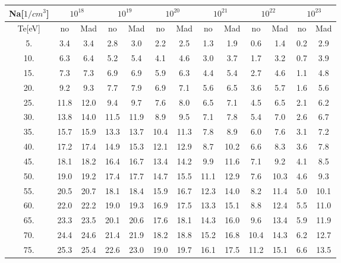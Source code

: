 \begin{tabular}{|c||c|c|c|c|c|c|c|c|c|c|c|c|}
\hline
Na[$1/cm^3$] & \multicolumn{2}{|c|}{$10^{18}$} & \multicolumn{2}{|c|}{$10^{19}$} & \multicolumn{2}{|c|}{$10^{20}$} & \multicolumn{2}{|c|}{$10^{21}$} & \multicolumn{2}{|c|}{$10^{22}$} & \multicolumn{2}{|c|}{$10^{23}$}\tabularnewline
\hline
Te[eV] & no & Mad & no & Mad & no & Mad & no & Mad & no & Mad & no & Mad\tabularnewline
\hline
\hline
   5. &     3.4 &     3.4 &     2.8 &     3.0 &     2.2 &     2.5 &     1.3 &     1.9 &     0.6 &     1.4 &     0.2 &     2.9\tabularnewline
\hline
  10. &     6.3 &     6.4 &     5.2 &     5.4 &     4.1 &     4.6 &     3.0 &     3.7 &     1.7 &     3.2 &     0.7 &     3.9\tabularnewline
\hline
  15. &     7.3 &     7.3 &     6.9 &     6.9 &     5.9 &     6.3 &     4.4 &     5.4 &     2.7 &     4.6 &     1.1 &     4.8\tabularnewline
\hline
  20. &     9.2 &     9.3 &     7.7 &     7.9 &     6.9 &     7.1 &     5.6 &     6.5 &     3.6 &     5.7 &     1.6 &     5.6\tabularnewline
\hline
  25. &    11.8 &    12.0 &     9.4 &     9.7 &     7.6 &     8.0 &     6.5 &     7.1 &     4.5 &     6.5 &     2.1 &     6.2\tabularnewline
\hline
  30. &    13.8 &    14.0 &    11.5 &    11.9 &     8.9 &     9.5 &     7.1 &     7.8 &     5.4 &     7.0 &     2.6 &     6.7\tabularnewline
\hline
  35. &    15.7 &    15.9 &    13.3 &    13.7 &    10.4 &    11.3 &     7.8 &     8.9 &     6.0 &     7.6 &     3.1 &     7.2\tabularnewline
\hline
  40. &    17.2 &    17.4 &    14.9 &    15.3 &    12.1 &    12.9 &     8.7 &    10.2 &     6.6 &     8.3 &     3.6 &     7.8\tabularnewline
\hline
  45. &    18.1 &    18.2 &    16.4 &    16.7 &    13.4 &    14.2 &     9.9 &    11.6 &     7.1 &     9.2 &     4.1 &     8.5\tabularnewline
\hline
  50. &    19.0 &    19.2 &    17.4 &    17.7 &    14.7 &    15.5 &    11.1 &    12.9 &     7.6 &    10.3 &     4.6 &     9.3\tabularnewline
\hline
  55. &    20.5 &    20.7 &    18.1 &    18.4 &    15.9 &    16.7 &    12.3 &    14.0 &     8.2 &    11.4 &     5.0 &    10.1\tabularnewline
\hline
  60. &    22.0 &    22.2 &    19.0 &    19.3 &    16.9 &    17.5 &    13.3 &    15.1 &     8.8 &    12.4 &     5.5 &    11.0\tabularnewline
\hline
  65. &    23.3 &    23.5 &    20.1 &    20.6 &    17.6 &    18.1 &    14.3 &    16.0 &     9.6 &    13.4 &     5.9 &    11.9\tabularnewline
\hline
  70. &    24.4 &    24.6 &    21.4 &    21.9 &    18.2 &    18.8 &    15.2 &    16.8 &    10.4 &    14.3 &     6.2 &    12.7\tabularnewline
\hline
  75. &    25.3 &    25.4 &    22.6 &    23.0 &    19.0 &    19.7 &    16.1 &    17.5 &    11.2 &    15.1 &     6.6 &    13.5\tabularnewline

\end{tabular}
